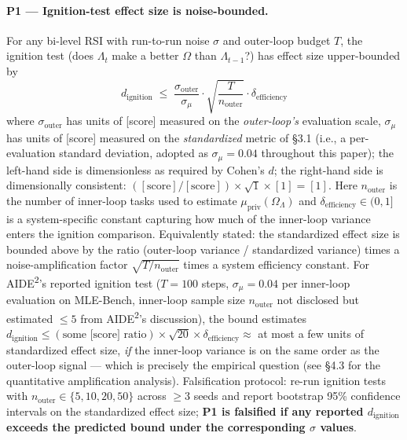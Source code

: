 \documentclass{article}
\theoremstyle{definition}
\begin{document}
\paragraph{P1 --- Ignition-test effect size is noise-bounded.}
For any bi-level RSI with run-to-run noise $\sigma$ and outer-loop budget $T$, the ignition test (does $\Lambda_t$ make a better $\Omega$ than $\Lambda_{t-1}$?) has effect size upper-bounded by
\[
d_{\text{ignition}} \;\le\; \frac{\sigma_{\text{outer}}}{\sigma_\mu} \cdot \sqrt{\frac{T}{n_{\text{outer}}}} \cdot \delta_{\text{efficiency}}
\]
where $\sigma_{\text{outer}}$ has units of [score] measured on the \emph{outer-loop's} evaluation scale, $\sigma_\mu$ has units of [score] measured on the \emph{standardized} metric of \S3.1 (i.e., a per-evaluation standard deviation, adopted as $\sigma_\mu = 0.04$ throughout this paper); the left-hand side is dimensionless as required by Cohen's $d$; the right-hand side is dimensionally consistent: $([\text{score}]/[\text{score}]) \times \sqrt{1} \times [1] = [1]$. Here $n_{\text{outer}}$ is the number of inner-loop tasks used to estimate $\mu_{\text{priv}}(\Omega_\Lambda)$ and $\delta_{\text{efficiency}} \in (0, 1]$ is a system-specific constant capturing how much of the inner-loop variance enters the ignition comparison. Equivalently stated: the standardized effect size is bounded above by the ratio (outer-loop variance / standardized variance) times a noise-amplification factor $\sqrt{T/n_{\text{outer}}}$ times a system efficiency constant. For AIDE\textsuperscript{2}'s reported ignition test ($T = 100$ steps, $\sigma_\mu = 0.04$ per inner-loop evaluation on MLE-Bench, inner-loop sample size $n_{\text{outer}}$ not disclosed but estimated $\leq 5$ from AIDE\textsuperscript{2}'s discussion), the bound estimates $d_{\text{ignition}} \leq (\text{some [score] ratio}) \times \sqrt{20} \times \delta_{\text{efficiency}} \approx$ at most a few units of standardized effect size, \textit{if} the inner-loop variance is on the same order as the outer-loop signal --- which is precisely the empirical question (see \S4.3 for the quantitative amplification analysis). Falsification protocol: re-run ignition tests with $n_{\text{outer}} \in \{5, 10, 20, 50\}$ across $\geq 3$ seeds and report bootstrap 95\% confidence intervals on the standardized effect size; \textbf{P1 is falsified if any reported $d_{\text{ignition}}$ exceeds the predicted bound under the corresponding $\sigma$ values}.
\end{document}
